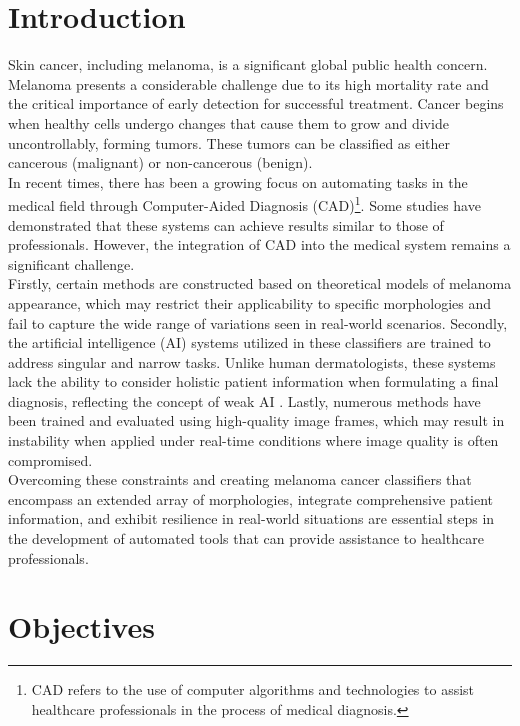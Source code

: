 \section*{Introduction}

Skin cancer, including melanoma, is a significant global public health concern.
Melanoma presents a considerable challenge due to its high mortality rate and
the critical importance of early detection for successful treatment. Cancer
begins when healthy cells undergo changes that cause them to grow and divide
uncontrollably, forming tumors. These tumors can be classified as either
cancerous (malignant) or non-cancerous (benign).\\

In recent times, there has been a growing focus on automating tasks in the
medical field through Computer-Aided Diagnosis (CAD)\footnote{CAD refers to the
use of computer algorithms and technologies to assist healthcare professionals
in the process of medical diagnosis.}. Some studies have demonstrated that
these systems can achieve results similar to those of professionals. However,
the integration of CAD into the medical system remains a significant challenge. \\

Firstly, certain methods are constructed based on theoretical models of
melanoma appearance, which may restrict their applicability to specific
morphologies and fail to capture the wide range of variations seen in
real-world scenarios. Secondly, the artificial intelligence (AI) systems
utilized in these classifiers are trained to address singular and narrow tasks.
Unlike human dermatologists, these systems lack the ability to consider
holistic patient information when formulating a final diagnosis, reflecting the
concept of weak AI \cite{WeakAI}. Lastly, numerous methods have been trained
and evaluated using high-quality image frames, which may result in instability
when applied under real-time conditions where image quality is often
compromised. \\

Overcoming these constraints and creating melanoma cancer classifiers that
encompass an extended array of morphologies, integrate comprehensive patient
information, and exhibit resilience in real-world situations are essential
steps in the development of automated tools that can provide assistance to
healthcare professionals.

\newpage

\section{Objectives}

